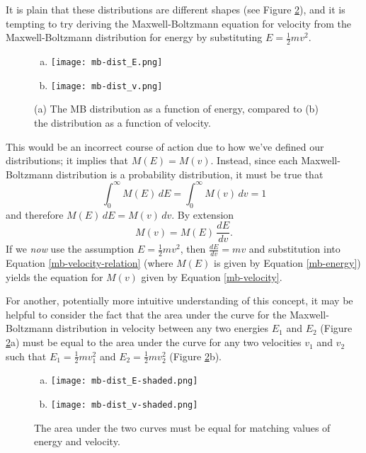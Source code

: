 \documentclass{report}
\begin{document}
It is plain that these distributions are different shapes (see Figure \ref{mb-dist-plots}), and it is tempting to try deriving the Maxwell-Boltzmann equation for velocity from the Maxwell-Boltzmann distribution for energy by substituting $E = \frac{1}{2}mv^2$.
\begin{figure}[b]
\begin{multicols}{2}\begin{enumerate}[(a)]
\item \texttt{[image: mb-dist\_E.png]}
\item \texttt{[image: mb-dist\_v.png]}
\end{enumerate}\end{multicols}
\caption{(a) The MB distribution as a function of energy, compared to (b) the distribution as a function of velocity.}
\label{mb-dist-plots}
\end{figure}
This would be an incorrect course of action due to how we've defined our distributions; it implies that $M(E) = M(v)$.
Instead, since each Maxwell-Boltzmann distribution is a probability distribution, it must be true that 
\begin{equation}
\int_0^{\infty} M(E) \, dE = \int_0^{\infty} M(v) \, dv = 1
\label{mb-normalized}
\end{equation}
and therefore $M(E) \, dE = M(v) \, dv$. By extension 
\begin{equation}
M(v) = M(E) \, \frac{dE}{dv} .
\label{mb-velocity-relation}
\end{equation}
If we \textit{now} use the assumption $E = \frac{1}{2}mv^2$, then $\frac{dE}{dv} = mv$ and substitution into Equation \ref{mb-velocity-relation} (where $M(E)$ is given by Equation \ref{mb-energy}) yields the equation for $M(v)$ given by Equation \ref{mb-velocity}.

For another, potentially more intuitive understanding of this concept, it may be helpful to consider the fact that the area under the curve for the Maxwell-Boltzmann distribution in velocity between any two energies $E_1$ and $E_2$ (Figure \ref{mb-dist-plots}a) must be equal to the area under the curve for any two velocities $v_1$ and $v_2$ such that $E_1 = \frac{1}{2}m v_1^2$ and $E_2 = \frac{1}{2}m v_2^2$ (Figure \ref{mb-dist-plots}b).
\begin{figure}[h]
\begin{multicols}{2}\begin{enumerate}[(a)]
\item \texttt{[image: mb-dist\_E-shaded.png]}
\item \texttt{[image: mb-dist\_v-shaded.png]}
\end{enumerate}\end{multicols}
\caption{The area under the two curves must be equal for matching values of energy and velocity.}
\label{mb-dist-plots}
\end{figure}
\end{document}
